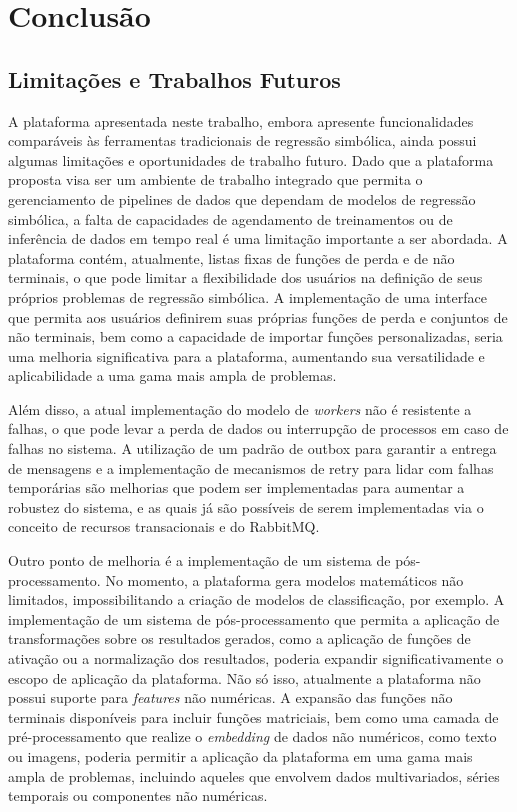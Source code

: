 \chapter{Conclusão}
\section{Limitações e Trabalhos Futuros}
A plataforma apresentada neste trabalho, embora apresente funcionalidades comparáveis às ferramentas tradicionais de regressão simbólica, ainda possui algumas limitações e oportunidades de trabalho futuro. Dado que a plataforma proposta visa ser um ambiente de trabalho integrado que permita o gerenciamento de pipelines de dados que dependam de modelos de regressão simbólica, a falta de capacidades de agendamento de treinamentos ou de inferência de dados em tempo real é uma limitação importante a ser abordada. A plataforma contém, atualmente, listas fixas de funções de perda e de não terminais, o que pode limitar a flexibilidade dos usuários na definição de seus próprios problemas de regressão simbólica. A implementação de uma interface que permita aos usuários definirem suas próprias funções de perda e conjuntos de não terminais, bem como a capacidade de importar funções personalizadas, seria uma melhoria significativa para a plataforma, aumentando sua versatilidade e aplicabilidade a uma gama mais ampla de problemas.

Além disso, a atual implementação do modelo de \textit{workers} não é resistente a falhas, o que pode levar a perda de dados ou interrupção de processos em caso de falhas no sistema. A utilização de um padrão de outbox para garantir a entrega de mensagens e a implementação de mecanismos de retry para lidar com falhas temporárias são melhorias que podem ser implementadas para aumentar a robustez do sistema, e as quais já são possíveis de serem implementadas via o conceito de recursos transacionais e do RabbitMQ.

Outro ponto de melhoria é a implementação de um sistema de pós-processamento. No momento, a plataforma gera modelos matemáticos não limitados, impossibilitando a criação de modelos de classificação, por exemplo. A implementação de um sistema de pós-processamento que permita a aplicação de transformações sobre os resultados gerados, como a aplicação de funções de ativação ou a normalização dos resultados, poderia expandir significativamente o escopo de aplicação da plataforma. Não só isso, atualmente a plataforma não possui suporte para \textit{features} não numéricas. A expansão das funções não terminais disponíveis para incluir funções matriciais, bem como uma camada de pré-processamento que realize o \textit{embedding} de dados não numéricos, como texto ou imagens, poderia permitir a aplicação da plataforma em uma gama mais ampla de problemas, incluindo aqueles que envolvem dados multivariados, séries temporais ou componentes não numéricas.

